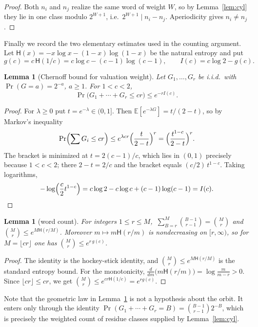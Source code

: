 \documentclass[11pt,reqno]{amsart}
\theoremstyle{plain}
\newtheorem{lemma}[theorem]{Lemma}
\theoremstyle{definition}
\numberwithin{equation}{section}
\newcommand{\Ent}{\mathsf{H}}
\begin{document}
\begin{proof}
Both $n_i$ and $n_j$ realize the same word of weight $W$, so by
Lemma~\ref{lem:cyl} they lie in one class modulo $2^{W+1}$, i.e.\
$2^{W+1}\mid n_i-n_j$.  Aperiodicity gives $n_i\ne n_j$.
\end{proof}

Finally we record the two elementary estimates used in the counting argument.
Let $\Ent(x)=-x\log x-(1-x)\log(1-x)$ be the natural entropy and put
\[
g(c)=c\,\Ent(1/c)=c\log c-(c-1)\log(c-1),
\qquad
I(c)=c\log2-g(c) .
\]

\begin{lemma}[Chernoff bound for valuation weight]
\label{lem:chernoff}
Let $G_1,\dots,G_r$ be i.i.d.\ with $\Pr(G=a)=2^{-a}$, $a\ge1$.  For
$1<c<2$,
\[
\Pr\bigl(G_1+\cdots+G_r\le cr\bigr)\le e^{-rI(c)} .
\]
\end{lemma}

\begin{proof}
For $\lambda\ge0$ put $t=e^{-\lambda}\in(0,1]$.  Then
$\mathbb E[e^{-\lambda G}]=t/(2-t)$, so by Markov's inequality
\[
\Pr\Bigl(\sum G_i\le cr\Bigr)
\le e^{\lambda cr}\Bigl(\frac t{2-t}\Bigr)^r
=\Bigl(\frac{t^{1-c}}{2-t}\Bigr)^{r}.
\]
The bracket is minimized at $t=2(c-1)/c$, which lies in $(0,1)$ precisely
because $1<c<2$; there $2-t=2/c$ and the bracket equals
$(c/2)\,t^{1-c}$.  Taking logarithms,
\[
-\log\Bigl(\frac c2t^{1-c}\Bigr)
=c\log2-c\log c+(c-1)\log(c-1)=I(c). \qedhere
\]
\end{proof}

\begin{lemma}[word count]
\label{lem:words}
For integers $1\le r\le M$, $\ \sum_{B=r}^{M}\binom{B-1}{r-1}=\binom Mr$ and
$\binom Mr\le e^{M\Ent(r/M)}$.  Moreover $m\mapsto m\Ent(r/m)$ is
nondecreasing on $[r,\infty)$, so for $M=\lfloor cr\rfloor$ one has
$\binom{M}{r}\le e^{r\,g(c)}$.
\end{lemma}

\begin{proof}
The identity is the hockey-stick identity, and
$\binom Mr\le e^{M\Ent(r/M)}$ is the standard entropy bound.  For the
monotonicity, $\frac{d}{dm}\bigl(m\Ent(r/m)\bigr)=\log\frac m{m-r}>0$.
Since $\lfloor cr\rfloor\le cr$, we get
$\binom Mr\le e^{cr\Ent(1/c)}=e^{rg(c)}$.
\end{proof}

Note that the geometric law in Lemma~\ref{lem:chernoff} is not a hypothesis
about the orbit.  It enters only through the identity
$\Pr(G_1+\cdots+G_r=B)=\binom{B-1}{r-1}2^{-B}$, which is precisely the
weighted count of residue classes supplied by Lemma~\ref{lem:cyl}.
\end{document}
